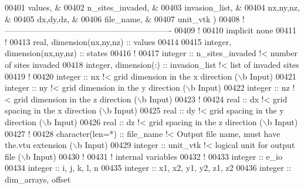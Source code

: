 \begin{DoxyCode}
00401                                             values,          &
00402                                             n\_sites\_invaded, &
00403                                             invasion\_list,   &
00404                                             nx,ny,nz,        &
00405                                             dx,dy,dz,        &
00406                                             file\_name,       &
00407                                             unit\_vtk         )
00408 \textcolor{comment}{!-------------------------------------------------------------}
00409 \textcolor{comment}{!}
00410 \textcolor{keyword}{implicit none}
00411 \textcolor{comment}{!}
00413 \textcolor{keywordtype}{real}, \textcolor{keywordtype}{dimension(nx,ny,nz)} :: values
00414 
00415 \textcolor{keywordtype}{integer}, \textcolor{keywordtype}{dimension(nx,ny,nz)} :: states
00416 \textcolor{comment}{!}
00417 \textcolor{keywordtype}{integer} :: n\_sites\_invaded \textcolor{comment}{!< number of sites invaded}
00418 \textcolor{keywordtype}{integer}, \textcolor{keywordtype}{dimension(:)} :: invasion\_list \textcolor{comment}{!< list of invaded sites}
00419 \textcolor{comment}{!}
00420 \textcolor{keywordtype}{integer} :: nx \textcolor{comment}{!< grid dimension in the x direction (\(\backslash\)b Input)}
00421 \textcolor{keywordtype}{integer} :: ny \textcolor{comment}{!< grid dimension in the y direction (\(\backslash\)b Input)}
00422 \textcolor{keywordtype}{integer} :: nz \textcolor{comment}{!< grid dimension in the z direction (\(\backslash\)b Input)}
00423 \textcolor{comment}{!}
00424 \textcolor{keywordtype}{real} :: dx \textcolor{comment}{!< grid spacing in the x direction (\(\backslash\)b Input)}
00425 \textcolor{keywordtype}{real} :: dy \textcolor{comment}{!< grid spacing in the y direction (\(\backslash\)b Input)}
00426 \textcolor{keywordtype}{real} :: dz \textcolor{comment}{!< grid spacing in the z direction (\(\backslash\)b Input)}
00427 \textcolor{comment}{!}
00428 \textcolor{keywordtype}{character(len=*)} :: file\_name \textcolor{comment}{!< Output file name, must have the.vtu extension
       (\(\backslash\)b Input)}
00429 \textcolor{keywordtype}{integer} :: unit\_vtk \textcolor{comment}{!< logical unit for output file (\(\backslash\)b Input)}
00430 \textcolor{comment}{!}
00431 \textcolor{comment}{! internal variables}
00432 \textcolor{comment}{!}
00433 \textcolor{keywordtype}{integer} :: e\_io
00434 \textcolor{keywordtype}{integer} :: i, j, k, l, n
00435 \textcolor{keywordtype}{integer} :: x1, x2, y1, y2, z1, z2
00436 \textcolor{keywordtype}{integer} :: dim\_arrays, offset

\end{DoxyCode}
